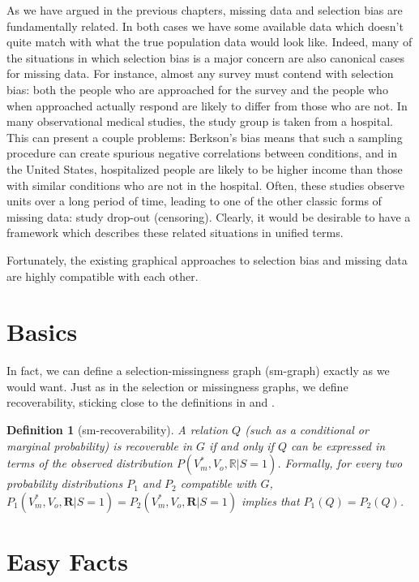 \documentclass[12pt,twoside]{reedthesis}
\newtheorem{definition}{Definition}[section]
\theoremstyle{definition}
\begin{document}
As we have argued in the previous chapters, missing data and selection bias are fundamentally related. In both cases we have some available data which doesn't quite match with what the true population data would look like. Indeed, many of the situations in which selection bias is a major concern are also canonical cases for missing data. For instance, almost any survey must contend with selection bias: both the people who are approached for the survey and the people who when approached actually respond are likely to differ from those who are not. In many observational medical studies, the study group is taken from a hospital. This can present a couple problems: Berkson's bias means that such a sampling procedure can create spurious negative correlations between conditions, and in the United States, hospitalized people are likely to be higher income than those with similar conditions who are not in the hospital. Often, these studies observe units over a long period of time, leading to one of the other classic forms of missing data: study drop-out (censoring). Clearly, it would be desirable to have a framework which describes these related situations in unified terms.

Fortunately, the existing graphical approaches to selection bias  and missing data  are highly compatible with each other. 

\section{Basics}

In fact, we can define a selection-missingness graph (sm-graph) exactly as we would want. Just as in the selection or missingness graphs, we define recoverability, sticking close to the definitions in \cite{Mohan_2013} and \citep{Bareinboim_2014}.

\begin{definition}[sm-recoverability]
A relation $Q$ (such as a conditional or marginal probability) is recoverable in $G$ if and only if $Q$ can be expressed in terms of the observed distribution $P(V^*_m, V_o, \mathbb{R}| S=1)$. Formally, for every two probability distributions $P_1$ and $P_2$ compatible with $G$, $P_1(V^*_m, V_o, \mathbf{R}| S=1) = P_2(V^*_m, V_o, \mathbf{R}| S=1)$ implies that $P_1(Q) = P_2(Q)$.
\end{definition}
\section{Easy Facts}
\end{document}
